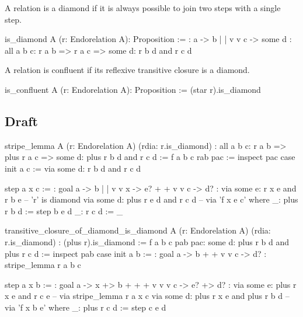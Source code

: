 A relation is a diamond if it is always possible to join two steps with a
single step.

\begin{alba}
  is_diamond A (r: Endorelation A): Proposition :=
      {:   a  ->  b
           |      |
           v      v
           c  -> some d :}
    all a b c:
      r a b
      => r a c
      => some d: r b d and r c d
\end{alba}


A relation is confluent if its reflexive transitive closure is a diamond.

\begin{alba}
  is_confluent A (r: Endorelation A): Proposition :=
    (star r).is_diamond
\end{alba}




\subsection{Draft}



\begin{alba}
   stripe_lemma
     A
     (r: Endorelation A)
     (rdia: r.is_diamond)
     : all a b c: r a b => plus r a c => some d: plus r b d and r c d :=
       f a b c rab pac :=
         inspect pac case
           init a c :=
             via some d: r b d and r c d

           step a x c :=
             {: goal a   ->   b
                     |        |
                     v        v
                     x   ->   e?
                     +        +
                     v        v
                     c  ->    d?  :}
             via some e: r x e and r b e         -- 'r' is diamond
             via some d: plus r e d and r c d   -- via 'f x e c'
             where
                _: plus r b d := step b e d
                _: r c d := _
\end{alba}


\begin{alba}
  transitive_closure_of_diamond_is_diamond
    A
    (r: Endorelation A)
    (rdia: r.is_diamond)
    : (plus r).is_diamond :=
      f a b c pab pac: some d: plus r b d and plus r c d :=
        inspect pab case
          init a b :=
            {: goal  a -> b
                     +    +
                     v    v
                     c -> d?  :}
            stripe_lemma r a b c

          step a x b :=
            {: goal a -> x  +> b
                    +    +     +
                    v    v     v
                    c -> e? +> d? :}
            via some e: plus r x e and r c e       -- via stripe_lemma r a x c
            via some d: plus r x e and plus r b d  -- via 'f x b e'
            where
               _: plus r c d := step c e d

\end{alba}











